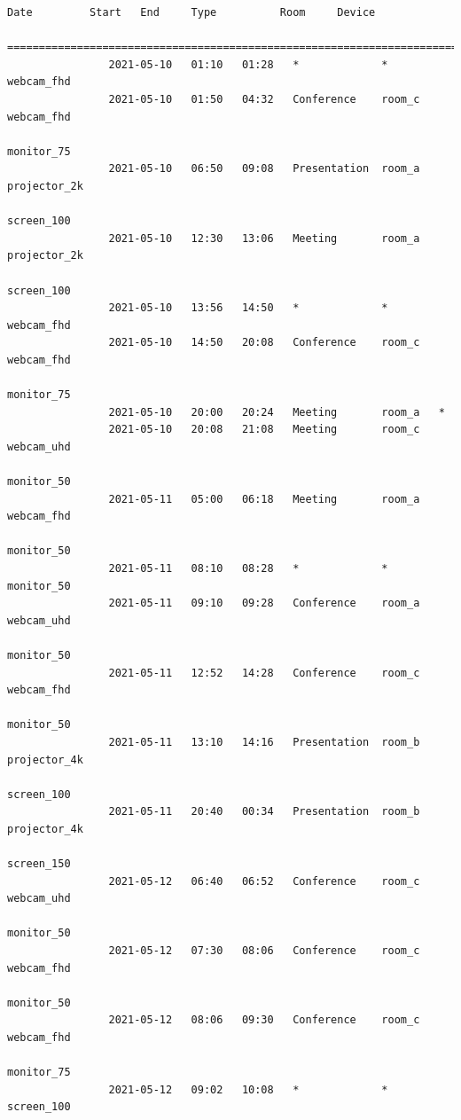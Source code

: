 \documentclass{article}
\begin{document}
\begin{Verbatim}[gobble=8]
                Date         Start   End     Type          Room     Device
                ===========================================================================
                2021-05-10   01:10   01:28   *             *        webcam_fhd
                2021-05-10   01:50   04:32   Conference    room_c   webcam_fhd
                                                                    monitor_75
                2021-05-10   06:50   09:08   Presentation  room_a   projector_2k
                                                                    screen_100
                2021-05-10   12:30   13:06   Meeting       room_a   projector_2k
                                                                    screen_100
                2021-05-10   13:56   14:50   *             *        webcam_fhd
                2021-05-10   14:50   20:08   Conference    room_c   webcam_fhd
                                                                    monitor_75
                2021-05-10   20:00   20:24   Meeting       room_a   *
                2021-05-10   20:08   21:08   Meeting       room_c   webcam_uhd
                                                                    monitor_50
                2021-05-11   05:00   06:18   Meeting       room_a   webcam_fhd
                                                                    monitor_50
                2021-05-11   08:10   08:28   *             *        monitor_50
                2021-05-11   09:10   09:28   Conference    room_a   webcam_uhd
                                                                    monitor_50
                2021-05-11   12:52   14:28   Conference    room_c   webcam_fhd
                                                                    monitor_50
                2021-05-11   13:10   14:16   Presentation  room_b   projector_4k
                                                                    screen_100
                2021-05-11   20:40   00:34   Presentation  room_b   projector_4k
                                                                    screen_150
                2021-05-12   06:40   06:52   Conference    room_c   webcam_uhd
                                                                    monitor_50
                2021-05-12   07:30   08:06   Conference    room_c   webcam_fhd
                                                                    monitor_50
                2021-05-12   08:06   09:30   Conference    room_c   webcam_fhd
                                                                    monitor_75
                2021-05-12   09:02   10:08   *             *        screen_100

\end{Verbatim}
\end{document}
